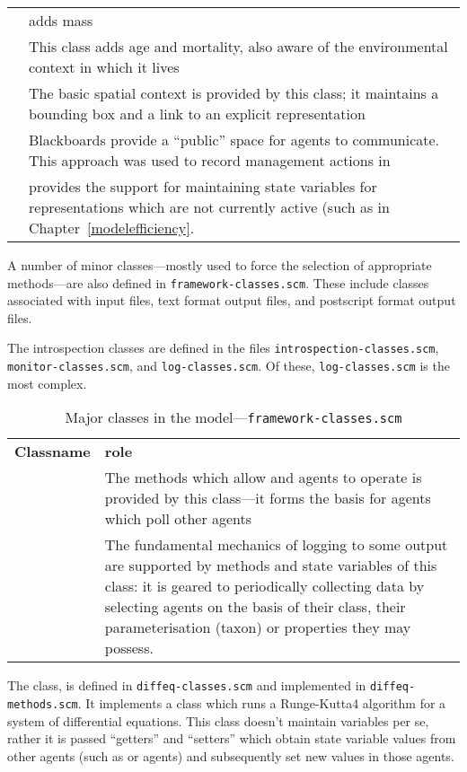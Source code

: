 \begin{table}[h]
\begin{center}
\begin{tabular}{l L{7cm}}
     & adds mass \\
     & This class adds age and mortality, also aware of the
    environmental context in which it lives \\
     & The basic spatial context is provided by
    this class; it maintains a bounding
    box and a link to an explicit representation\\
     & Blackboards provide a ``public'' space for
    agents to communicate. This approach was used to record
    management actions in \cite{grayningaloo}\\
     & provides the support for maintaining
    state variables for representations which are not currently active
    (such as in Chapter~\ref{modelefficiency}. \\
    \bottomrule
  \end{tabular}
\end{center}
\end{table}
A number of minor classes---mostly used to force the selection of
appropriate methods---are also defined in 
\texttt{framework-classes.scm}. These include classes associated with
input files, text format output files, and postscript format output files.

The introspection classes are defined in the files
\texttt{introspection-classes.scm}, \texttt{monitor-classes.scm}, and
\texttt{log-classes.scm}.  Of these, \texttt{log-classes.scm} is the
most complex.


\begin{table}[h]
\begin{center}
  \caption{Major classes in the model---\texttt{framework-classes.scm}}
  \begin{tabular}{l L{7cm}}
    \textbf{Classname} & \textbf{role} \\
     & The methods which allow
     and  agents to operate is provided by
    this class---it forms the basis for agents which poll other agents \\
     & The fundamental mechanics of logging
    to some output are supported by methods and state variables of
    this class: it is geared to periodically collecting data by
    selecting agents on the basis of their class, their
    parameterisation (taxon) or properties they may possess.
  \end{tabular}
\end{center}
\end{table}
The class,  is defined in \texttt{diffeq-classes.scm}
and implemented in \texttt{diffeq-methods.scm}.  It implements a class
which runs a Runge-Kutta4 algorithm for a system of differential
equations.  This class doesn't maintain variables per se, rather it is
passed ``getters'' and ``setters'' which obtain state variable values
from other agents (such as \mproxy or \mservice agents) and
subsequently set new values in those agents.

